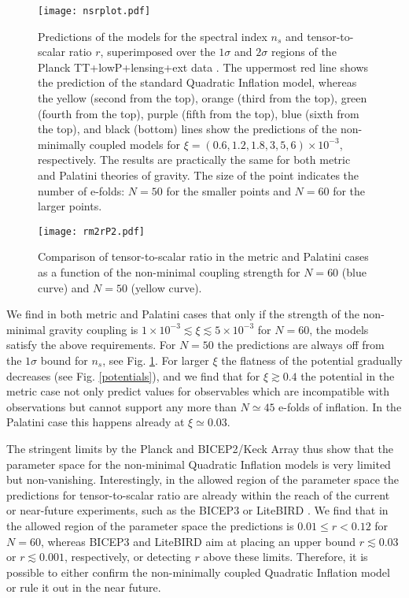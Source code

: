 \documentclass[11pt,a4paper]{article}
\begin{document}
\begin{figure}
\begin{center}
\texttt{[image: nsrplot.pdf]}
\caption{Predictions of the models for the spectral index $n_s$ and tensor-to-scalar ratio $r$, superimposed over the $1\sigma$ and $2\sigma$ regions of the Planck TT+lowP+lensing+ext data \cite{Ade:2015xua}. The uppermost red line shows the prediction of the standard Quadratic Inflation model, whereas the yellow (second from the top), orange (third from the top), green (fourth from the top), purple (fifth from the top), blue (sixth from the top), and black (bottom) lines show the predictions of the non-minimally coupled models for $\xi=(0.6,1.2,1.8,3,5,6)\times 10^{-3}$, respectively. The results are practically the same for both metric and Palatini theories of gravity. The size of the point indicates the number of e-folds: $N=50$ for the smaller points and $N=60$ for the larger points.}
\label{nsrplot}
\end{center}
\end{figure}

\begin{figure}
\begin{center}
\texttt{[image: rm2rP2.pdf]}
\caption{Comparison of tensor-to-scalar ratio in the metric and Palatini cases as a function of the non-minimal coupling strength for $N=60$ (blue curve) and $N=50$ (yellow curve).}
\label{rm2rP2}
\end{center}
\end{figure}

We find in both metric and Palatini cases that only if the strength of the non-minimal gravity coupling is $1\times 10^{-3}\lesssim \xi\lesssim 5\times 10^{-3}$ for $N=60$, the models satisfy the above requirements. For $N=50$ the predictions are always off from the $1\sigma$ bound for $n_s$, see Fig. \ref{nsrplot}. For larger $\xi$ the flatness of the potential gradually decreases (see Fig. \ref{potentials}), and we find that for $\xi\gtrsim 0.4$ the potential in the metric case not only predict values for observables which are incompatible with observations but cannot support any more than $N\simeq 45$ e-folds of inflation. In the Palatini case this happens already at $\xi\simeq 0.03$.

The stringent limits by the Planck and BICEP2/Keck Array thus show that the parameter space for the non-minimal Quadratic Inflation models is very limited but non-vanishing. Interestingly, in the allowed region of the parameter space the predictions for tensor-to-scalar ratio are already within the reach of the current or near-future experiments, such as the BICEP3 \cite{Wu:2016hul} or LiteBIRD \cite{Matsumura:2013aja}. We find that in the allowed region of the parameter space the predictions is $0.01\leq r < 0.12$ for $N=60$, whereas BICEP3 and LiteBIRD aim at placing an upper bound $r\lesssim 0.03$ or $r\lesssim 0.001$, respectively, or detecting $r$ above these limits. Therefore, it is possible to either confirm the non-minimally coupled Quadratic Inflation model or rule it out in the near future.
\end{document}
